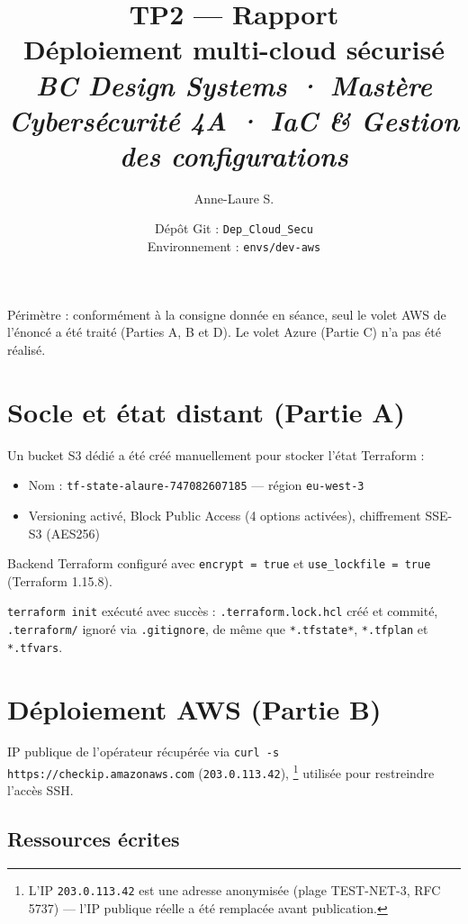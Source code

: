 \documentclass[11pt,a4paper]{article}
\title{
    {\color{navy}\Huge\textbf{TP2 --- Rapport}}\\[0.4em]
    {\Large\color{grey} Déploiement multi-cloud sécurisé}\\[0.6em]
    {\small\itshape\color{grey}
    BC Design Systems · Mastère Cybersécurité 4A ·
    IaC \& Gestion des configurations}
}
\author{Anne-Laure S.}
\date{
    Dépôt Git : \texttt{Dep\_Cloud\_Secu}\\
    Environnement : \texttt{envs/dev-aws}
}
\begin{document}
\maketitle

\thispagestyle{fancy}


\begin{leftbar}
\color{navy}\itshape
\colorbox{goldbg}{
\parbox{\dimexpr\linewidth-2\fboxsep}{
Périmètre : conformément à la consigne donnée en séance,
seul le volet AWS de l'énoncé a été traité (Parties A, B et D).
Le volet Azure (Partie C) n'a pas été réalisé.
}}
\end{leftbar}

\vspace{6pt}


\section{Socle et état distant (Partie A)}

Un bucket S3 dédié a été créé manuellement pour stocker l'état Terraform :

\begin{itemize}[leftmargin=1.2em]
    \item Nom : \texttt{tf-state-alaure-747082607185}
    --- région \texttt{eu-west-3}
    \item Versioning activé, Block Public Access (4 options activées),
    chiffrement SSE-S3 (AES256)
\end{itemize}

Backend Terraform configuré avec
\texttt{encrypt = true} et
\texttt{use\_lockfile = true}
(Terraform 1.15.8).

\texttt{terraform init} exécuté avec succès :
\texttt{.terraform.lock.hcl} créé et commité,
\texttt{.terraform/} ignoré via \texttt{.gitignore},
de même que \texttt{*.tfstate*},
\texttt{*.tfplan} et
\texttt{*.tfvars}.


\section{Déploiement AWS (Partie B)}

IP publique de l'opérateur récupérée via
\texttt{curl -s https://checkip.amazonaws.com}
(\texttt{203.0.113.42}),
\footnote{L'IP \texttt{203.0.113.42} est une adresse anonymisée (plage TEST-NET-3, RFC 5737) — l'IP publique réelle a été remplacée avant publication.}
utilisée pour restreindre l'accès SSH.

\subsection{Ressources écrites}
\end{document}
